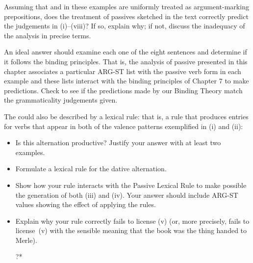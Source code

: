\documentclass[a4paper,landscape,headrule,footrule]{foils}
\begin{document}
\noindent
Assuming that  and  in these examples are uniformly
treated as  argument-marking prepositions, 
does the treatment of passives sketched in the text
correctly predict the judgements in (i)--(viii)?
If so, explain why; if not, discuss the inadequacy of the analysis in
precise terms. 

An ideal answer should examine each one of the eight sentences and determine
if it follows the binding principles. That is, the analysis of passive
presented in this chapter associates a particular ARG-ST list with the passive
verb form in each example and these lists interact with the binding principles
of Chapter 7 to make predictions. Check to see if the predictions made by our
Binding Theory match the grammaticality judgements given. 


The  could also be described by a lexical
rule: that is, a rule that produces entries for verbs that appear in
both of the valence patterns exemplified in (i) and (ii):

\begin{exe}
 
 
\end{exe}

\begin{itemize}
\item[A.] Is this alternation productive?  Justify your answer with at
  least two examples.
\item[B.] Formulate a  lexical rule for the dative
  alternation. 
\newpage
\item[C.] Show how your rule interacts with the Passive Lexical Rule
  to make possible the generation of both (iii) and (iv).  Your answer
  should include ARG-ST values showing the effect of applying the
  rules. 
\begin{exe}
 
  
\end{exe}
\item[D.] Explain why your rule correctly fails to license (v) (or,
more precisely, fails to license~(v) with the sensible meaning
that the book was the thing handed to Merle).
\begin{exe}
 ?*
\end{exe}
\end{itemize}
\end{document}
